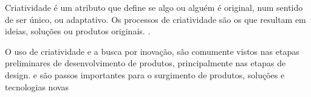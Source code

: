 Criatividade é um atributo que define se algo ou alguém é original, num sentido de ser único, ou adaptativo. Os processos de criatividade são os que resultam em ideias, soluções ou produtos originais. \cite{runco1995cognition}.

O uso de criatividade e a busca por inovação, são comumente vistos nas etapas preliminares de desenvolvimento de produtos, principalmente nas etapas de design. \cite{chen_artificial_2019} e são passos importantes para o surgimento de produtos, soluções e tecnologias novas\cite{edwards_if_2022}